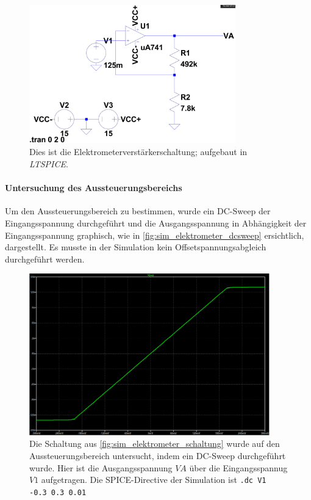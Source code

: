 \documentclass[12pt,english,ngerman]{scrartcl}
\begin{document}
\begin{figure}[H]
  \centering
    \includegraphics[width=\textwidth, height=6cm,keepaspectratio]{./figures/elektrometer/sim/sim_schaltung.png}
  \caption{Dies ist die Elektrometerverstärkerschaltung; aufgebaut in \textit{LTSPICE}.}
  \label{fig:sim_elektrometer_schaltung}
\end{figure}


\paragraph{Untersuchung des Aussteuerungsbereichs} \label{sec:mess_aussteuerungsbereich}

Um den Aussteuerungsbereich zu bestimmen, wurde ein DC-Sweep der
Eingangsspannung durchgeführt und die Ausgangsspannung in Abhängigkeit der
Eingangsspannung graphisch, wie in \autoref{fig:sim_elektrometer_dcsweep}
ersichtlich, dargestellt. Es musste in der Simulation kein
Offsetspannungsabgleich durchgeführt werden.

\begin{figure}[H]
  \centering
    \includegraphics[width=\linewidth, height=7cm]{./figures/elektrometer/sim/aus_sweep.png}
  \caption{Die Schaltung aus \autoref{fig:sim_elektrometer_schaltung} wurde auf
    den Aussteuerungsbereich untersucht, indem ein DC-Sweep durchgeführt wurde.
    Hier ist die Ausgangsspannung $VA$ über die Eingangsspannug $V1$
    aufgetragen. Die SPICE-Directive der Simulation ist \texttt{.dc V1 -0.3 0.3 0.01}}
  \label{fig:sim_elektrometer_dcsweep}
\end{figure}
\end{document}
